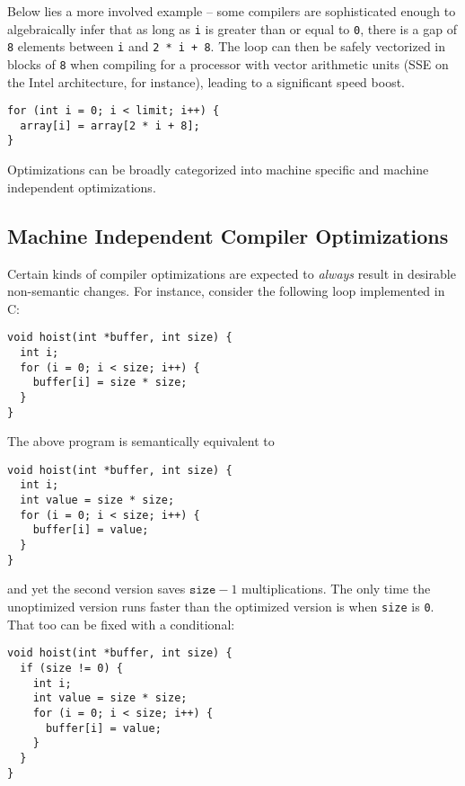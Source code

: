 Below lies a more involved example -- some compilers are sophisticated
enough to algebraically infer that as long as \texttt{i} is greater
than or equal to \texttt{0}, there is a gap of \texttt{8} elements
between \texttt{i} and \texttt{2 * i + 8}. The loop can then be safely
vectorized in blocks of \texttt{8} when compiling for a processor with
vector arithmetic units (SSE on the Intel architecture, for instance),
leading to a significant speed boost.

\begin{verbatim}
for (int i = 0; i < limit; i++) {
  array[i] = array[2 * i + 8];
}
\end{verbatim}

Optimizations can be broadly categorized into machine specific and
machine independent optimizations.

\subsection{Machine Independent Compiler Optimizations}

Certain kinds of compiler optimizations are expected to
\textit{always} result in desirable non-semantic changes.  For
instance, consider the following loop implemented in C:

\begin{verbatim}
void hoist(int *buffer, int size) {
  int i;
  for (i = 0; i < size; i++) {
    buffer[i] = size * size;
  }
}
\end{verbatim}

The above program is semantically equivalent to

\begin{verbatim}
void hoist(int *buffer, int size) {
  int i;
  int value = size * size;
  for (i = 0; i < size; i++) {
    buffer[i] = value;
  }
}
\end{verbatim}

and yet the second version saves $\texttt{size} - 1$ multiplications.
The only time the unoptimized version runs faster than the optimized
version is when \texttt{size} is \texttt{0}.  That too can be fixed
with a conditional:

\begin{verbatim}
void hoist(int *buffer, int size) {
  if (size != 0) {
    int i;
    int value = size * size;
    for (i = 0; i < size; i++) {
      buffer[i] = value;
    }
  }
}
\end{verbatim}


